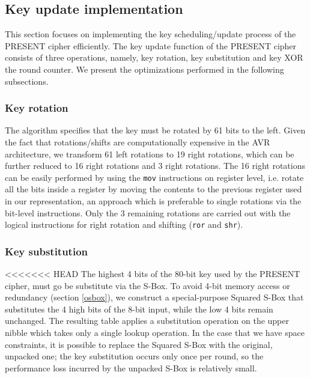 \documentclass[11pt]{article}
\begin{document}
\subsection{Key update implementation}
This section focuses on implementing the key scheduling/update process of the PRESENT cipher efficiently. The key update function of the PRESENT cipher consists of three operations, namely, key rotation, key substitution and key XOR the round counter. We present the optimizations performed in the following subsections.
\subsubsection{Key rotation}
The algorithm specifies that the key must be rotated by 61 bits to the left. Given the fact that rotations/shifts are computationally expensive in the AVR architecture, we transform 61 left rotations to 19 right rotations, which can be further reduced to 16 right rotations and 3 right rotations. The 16 right rotations can be easily performed by using the \texttt{mov} instructions on register level, i.e. rotate all the bits inside a register by moving the contents to the previous register used in our representation, an approach which is preferable to single rotations via the bit-level instructions. Only the 3 remaining rotations are carried out with the logical instructions for right rotation and shifting (\texttt{ror} and \texttt{shr}).
\subsubsection{Key substitution}
<<<<<<< HEAD
The highest 4 bits of the 80-bit key used by the PRESENT cipher, must go be substitute via the S-Box. To avoid 4-bit memory access or redundancy (section \ref{osbox}), we construct a special-purpose Squared S-Box that substitutes the 4 high bits of the 8-bit input, while the low 4 bits remain unchanged. The resulting table applies a substitution operation on the upper nibble which takes only a single lookup operation. In the case that we have space constraints, it is possible to replace the Squared S-Box with the original, unpacked one; the key substitution occurs only once per round, so the performance loss incurred by the unpacked S-Box is relatively small. 

\end{document}
